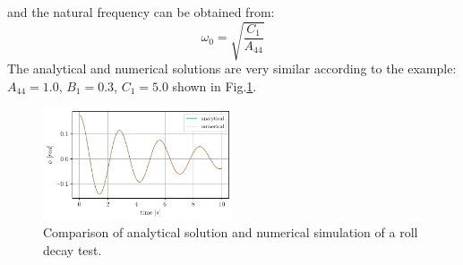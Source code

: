 and the natural frequency can be obtained from:
\begin{equation}
\omega_{0} = \sqrt{\frac{C_{1}}{A_{44}}}
\label{eq:omega0_eq}
\end{equation}
The analytical and numerical solutions are very similar according to the
example: $A_{44} = 1.0$, $B_1 = 0.3$, $C_1 = 5.0$ shown in
Fig.\ref{fig:analytical_numerical}.
\begin{figure}[H]
\begin{center}\includegraphics[width = 0.5\textwidth]{figures/analytical_numerical.pdf}\end{center}
\vspace{-1cm}
\caption{Comparison of analytical solution and numerical simulation of a roll decay test.}
\label{fig:analytical_numerical}
\end{figure}

